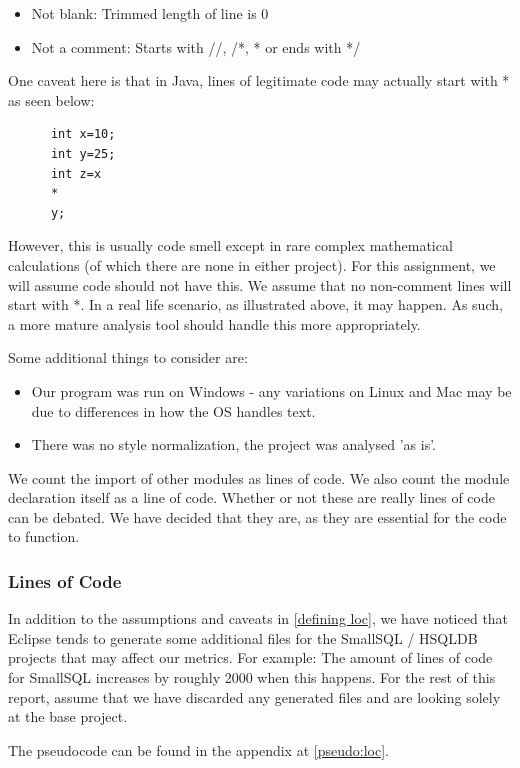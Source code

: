 \documentclass{article}
\begin{document}
\begin{itemize}
\item Not blank: Trimmed length of line is 0
\item Not a comment: Starts with //, /*, * or ends with */
\end{itemize}

One caveat here is that in Java, lines of legitimate code may actually start with * as seen below:
\begin{lstlisting}
      int x=10;
      int y=25;
      int z=x
      *
      y;
\end{lstlisting}

However, this is usually code smell except in rare complex mathematical calculations (of which there are none in either project). For this assignment, we will assume code should not have this. We assume that no non-comment lines will start with *.
In a real life scenario, as illustrated above, it may happen. As such, a more mature analysis tool should handle this more appropriately.

Some additional things to consider are:
\begin{itemize}
\item Our program was run on Windows - any variations on Linux and Mac may be due to differences in how the OS handles text. 
\item There was no style normalization, the project was analysed 'as is'.
\end{itemize}

We count the import of other modules as lines of code. We also count the module declaration itself as a line of code. Whether or not these are really lines of code can be debated. We have decided that they are, as they are essential for the code to function.

\subsubsection{Lines of Code}
In addition to the assumptions and caveats in \ref{defining loc}, we have noticed that Eclipse tends to generate some additional files for the SmallSQL / HSQLDB projects that may affect our metrics. For example: The amount of lines of code for SmallSQL increases by roughly 2000 when this happens.
For the rest of this report, assume that we have discarded any generated files and are looking solely at the base project.

The pseudocode can be found in the appendix at \ref{pseudo:loc}.
\end{document}
